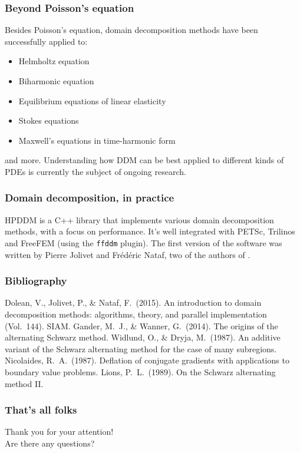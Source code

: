 \documentclass{beamer}
\begin{document}
\begin{frame}
\frametitle{Beyond Poisson's equation}
Besides Poisson's equation, domain decomposition methods have been
successfully applied to:
\begin{itemize}%
\item Helmholtz equation
\item Biharmonic equation
\item Equilibrium equations of linear elasticity
\item Stokes equations
\item Maxwell's equations in time-harmonic form
\end{itemize}
and more. Understanding how DDM can be best applied to different kinds of
PDEs is currently the subject of ongoing research.
\end{frame}

\begin{frame}
\frametitle{Domain decomposition, in practice}
HPDDM is a C++ library that implements various domain decomposition methods,
with a focus on performance. It's well integrated with PETSc, Trilinos and FreeFEM
(using the \texttt{ffddm} plugin).
The first version of the software was written by Pierre Jolivet and Frédéric Nataf,
two of the authors of \cite{nataf}.
\end{frame}

\begin{frame}
\frametitle{Bibliography}
\begin{thebibliography}{9}
 Dolean, V., Jolivet, P., \& Nataf, F.\ (2015).
An introduction to domain decomposition methods: algorithms,
theory, and parallel implementation (Vol.\ 144). SIAM.
 Gander, M.\ J., \& Wanner, G.\ (2014).
The origins of the alternating Schwarz method.
 Widlund, O., \& Dryja, M.\ (1987).
An additive variant of the Schwarz alternating method for the case of many subregions.
 Nicolaides, R.\ A.\ (1987).
Deflation of conjugate gradients with applications to boundary value problems.
 Lions, P.\ L.\ (1989).
On the Schwarz alternating method II.
\end{thebibliography}
\end{frame}

\begin{frame}
\frametitle{That's all folks}
\begin{center}
Thank you for your attention! \\[14pt]
Are there any questions?
\end{center}
\end{frame}
\end{document}
